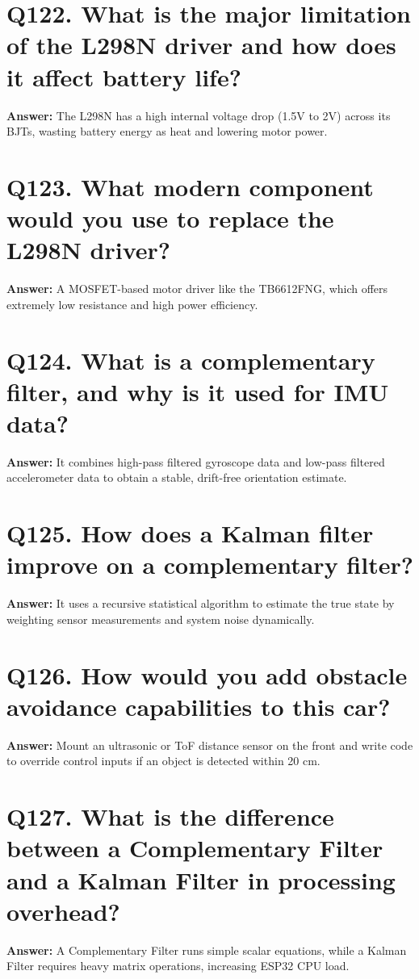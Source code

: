 \documentclass[12pt,a4paper,oneside]{report}
\begin{document}
\section{Q122. What is the major limitation of the L298N driver and how does it affect battery life?}
\textbf{Answer:} The L298N has a high internal voltage drop (1.5V to 2V) across its BJTs, wasting battery energy as heat and lowering motor power.

\section{Q123. What modern component would you use to replace the L298N driver?}
\textbf{Answer:} A MOSFET-based motor driver like the TB6612FNG, which offers extremely low resistance and high power efficiency.

\section{Q124. What is a complementary filter, and why is it used for IMU data?}
\textbf{Answer:} It combines high-pass filtered gyroscope data and low-pass filtered accelerometer data to obtain a stable, drift-free orientation estimate.

\section{Q125. How does a Kalman filter improve on a complementary filter?}
\textbf{Answer:} It uses a recursive statistical algorithm to estimate the true state by weighting sensor measurements and system noise dynamically.

\section{Q126. How would you add obstacle avoidance capabilities to this car?}
\textbf{Answer:} Mount an ultrasonic or ToF distance sensor on the front and write code to override control inputs if an object is detected within 20 cm.

\section{Q127. What is the difference between a Complementary Filter and a Kalman Filter in processing overhead?}
\textbf{Answer:} A Complementary Filter runs simple scalar equations, while a Kalman Filter requires heavy matrix operations, increasing ESP32 CPU load.
\end{document}
